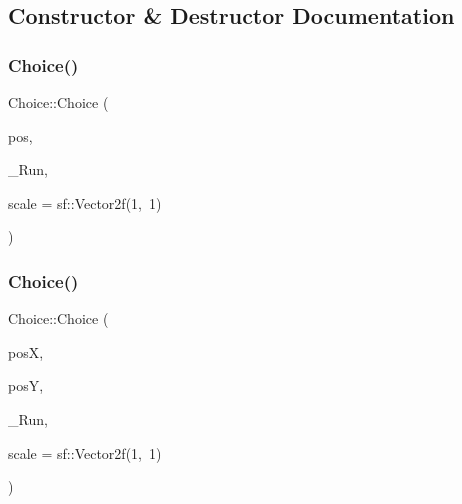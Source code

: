 \subsection{Constructor \& Destructor Documentation}
\mbox{\label{class_choice_aeea62a8f913a1aebdf6426a70b99813d}} 
\subsubsection{\texorpdfstring{Choice()}{Choice()}\hspace{0.1cm}{\footnotesize\ttfamily [1/2]}}
{\footnotesize\ttfamily Choice\+::\+Choice (\begin{DoxyParamCaption}\item[{sf\+::\+Vector2f}]{pos,  }\item[{std\+::function$<$ \hyperlink{_globals_8h_a3d5776bab98402b03be09156bacf4f68}{Screens}(sf\+::\+Render\+Target \&, \hyperlink{class_go___solver}{Go\+\_\+\+Solver} \&)$>$}]{\+\_\+\+Run,  }\item[{sf\+::\+Vector2f}]{scale = {\ttfamily sf\+:\+:Vector2f(1,~1)} }\end{DoxyParamCaption})}

\mbox{\label{class_choice_a72be01644a7ac52a0eaa2c34d9842686}} 
\subsubsection{\texorpdfstring{Choice()}{Choice()}\hspace{0.1cm}{\footnotesize\ttfamily [2/2]}}
{\footnotesize\ttfamily Choice\+::\+Choice (\begin{DoxyParamCaption}\item[{float}]{posX,  }\item[{float}]{posY,  }\item[{std\+::function$<$ \hyperlink{_globals_8h_a3d5776bab98402b03be09156bacf4f68}{Screens}(sf\+::\+Render\+Target \&, \hyperlink{class_go___solver}{Go\+\_\+\+Solver} \&)$>$}]{\+\_\+\+Run,  }\item[{sf\+::\+Vector2f}]{scale = {\ttfamily sf\+:\+:Vector2f(1,~1)} }\end{DoxyParamCaption})}

\mbox{\label{class_choice_ac60418c9d38713ccef3cb0dd1f14a083}} 
